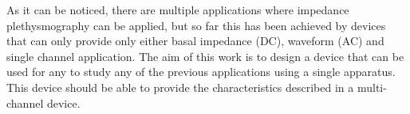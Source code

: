 %
%
%
%
%
%
As it can be noticed, there are multiple applications where impedance plethysmography can be applied, but so far this has been achieved by devices that can only provide only either basal impedance (DC), waveform (AC) and single channel application. The aim of this work is to design a device that can be used for any to study any of the previous applications using a single apparatus. This device should be able to provide the characteristics described in a multi-channel device.  

